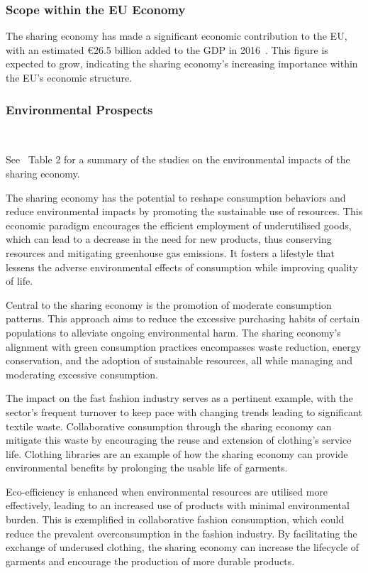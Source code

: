 \subsubsection{Scope within the EU Economy}
The sharing economy has made a significant economic contribution to the EU,
with an estimated €26.5 billion added to the GDP in 2016~\cite{pwc2016sharing}.
This figure is expected to grow, indicating the sharing economy's increasing
importance within the EU's economic structure.

\subsubsection{Environmental Prospects}~\cite{dabbous2021sharing, pwc2016sharing, dggrow2018sharingenv}

See~\cite{zhu2021sharing} Table 2 for a summary of the studies on the
environmental impacts of the sharing economy.

The sharing economy has the potential to reshape consumption behaviors and
reduce environmental impacts by promoting the sustainable use of resources.
This economic paradigm encourages the efficient employment of underutilised
goods, which can lead to a decrease in the need for new products, thus
conserving resources and mitigating greenhouse gas emissions. It fosters a
lifestyle that lessens the adverse environmental effects of consumption while
improving quality of life.

Central to the sharing economy is the promotion of moderate consumption
patterns. This approach aims to reduce the excessive purchasing habits of
certain populations to alleviate ongoing environmental harm. The sharing
economy's alignment with green consumption practices encompasses waste
reduction, energy conservation, and the adoption of sustainable resources, all
while managing and moderating excessive consumption.

The impact on the fast fashion industry serves as a pertinent example, with the
sector's frequent turnover to keep pace with changing trends leading to
significant textile waste. Collaborative consumption through the sharing
economy can mitigate this waste by encouraging the reuse and extension of
clothing's service life. Clothing libraries are an example of how the sharing
economy can provide environmental benefits by prolonging the usable life of
garments.

Eco-efficiency is enhanced when environmental resources are utilised more
effectively, leading to an increased use of products with minimal environmental
burden. This is exemplified in collaborative fashion consumption, which could
reduce the prevalent overconsumption in the fashion industry. By facilitating
the exchange of underused clothing, the sharing economy can increase the
lifecycle of garments and encourage the production of more durable products.

